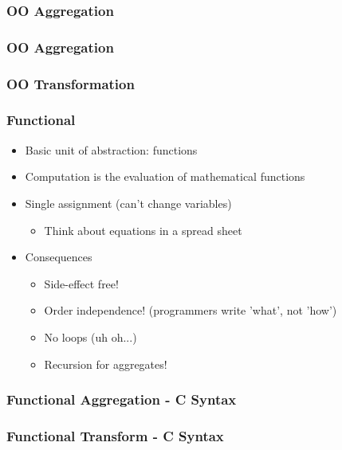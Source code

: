 \begin{frame}[fragile]
  \frametitle{OO Aggregation}
  \pause
  
\end{frame}

\begin{frame}[fragile]
  \frametitle{OO Aggregation}
  
\end{frame}

\begin{frame}[fragile]
  \frametitle{OO Transformation}
  \pause
  
\end{frame}

\begin{frame}
  \frametitle{Functional}
  \pause
  \begin{itemize}[<+->]
    \item Basic unit of abstraction: functions
    \item Computation is the evaluation of mathematical functions
    \item Single assignment (can't change variables)
      \begin{itemize}[<+->]
        \item Think about equations in a spread sheet
      \end{itemize}
    \item Consequences
          \begin{itemize}[<+->]
            \item Side-effect free!
            \item Order independence! (programmers write 'what', not 'how')
            \item No loops (uh oh...)
            \item Recursion for aggregates!
          \end{itemize}
  \end{itemize}
\end{frame}

\begin{frame}[fragile]
  \frametitle{Functional Aggregation - C Syntax}
  \pause
  
\end{frame}

\begin{frame}[fragile]
  \frametitle{Functional Transform - C Syntax}
  \pause
  
\end{frame}

